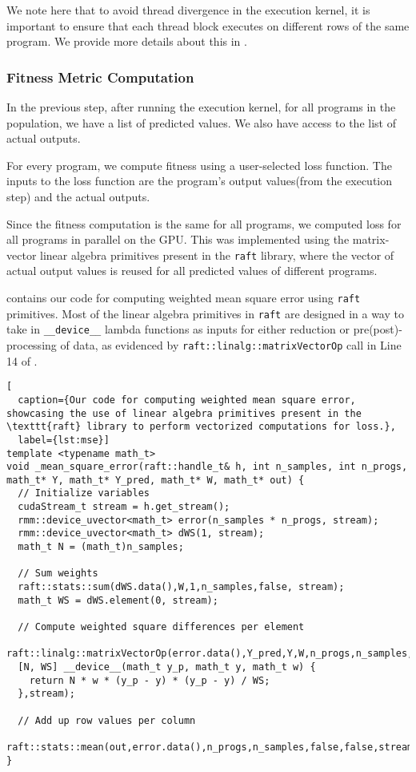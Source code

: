We note here that to avoid thread divergence in the execution kernel, it is important to ensure that each thread block executes on different rows of the same program. We provide more details about this in .

\subsubsection{Fitness Metric Computation}
\label{subsec:fitness}
In the previous step, after running the execution kernel, for all programs in the population, we have a list of predicted values. We also have access to the list of actual outputs. 

For every program, we compute fitness using a user-selected loss function. The inputs to the loss function are the program's output values(from the execution step) and the actual outputs.

Since the fitness computation is the same for all programs, we computed loss for all programs in parallel on the GPU. This was implemented using the matrix-vector linear algebra primitives present in the \texttt{raft} library\citep{raschka2020machine}, where the vector of actual output values is reused for all predicted values of different programs. 

 contains our code for computing weighted mean square error using \texttt{raft} primitives. Most of the linear algebra primitives in \texttt{raft} are designed in a way to take in \lstinline!__device__! lambda functions as inputs for either reduction or pre(post)-processing of data, as evidenced by \lstinline!raft::linalg::matrixVectorOp! call in Line 14 of .

\begin{lstlisting}[
  caption={Our code for computing weighted mean square error, showcasing the use of linear algebra primitives present in the \texttt{raft} library to perform vectorized computations for loss.},
  label={lst:mse}]
template <typename math_t>
void _mean_square_error(raft::handle_t& h, int n_samples, int n_progs, math_t* Y, math_t* Y_pred, math_t* W, math_t* out) {
  // Initialize variables
  cudaStream_t stream = h.get_stream();
  rmm::device_uvector<math_t> error(n_samples * n_progs, stream);
  rmm::device_uvector<math_t> dWS(1, stream);
  math_t N = (math_t)n_samples;

  // Sum weights
  raft::stats::sum(dWS.data(),W,1,n_samples,false, stream);
  math_t WS = dWS.element(0, stream);

  // Compute weighted square differences per element
  raft::linalg::matrixVectorOp(error.data(),Y_pred,Y,W,n_progs,n_samples,false,false,    
  [N, WS] __device__(math_t y_p, math_t y, math_t w) {
    return N * w * (y_p - y) * (y_p - y) / WS;
  },stream);

  // Add up row values per column
  raft::stats::mean(out,error.data(),n_progs,n_samples,false,false,stream);
}
\end{lstlisting}

